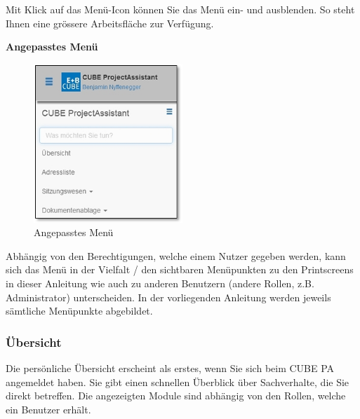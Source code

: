 \vspace{\baselineskip}

Mit Klick auf das Menü-Icon  können Sie das Menü ein- und ausblenden. So steht Ihnen eine grössere Arbeitsfläche zur Verfügung.

\vspace{6.5cm}  

\textbf{Angepasstes Menü}

\begin{figure}
\vspace{-50pt}
\includegraphics[height=60mm]{../chapters/01_Einfuehrung/pictures/1-3-1_MenuAngepasst.jpg}
\caption{Angepasstes Menü}
\end{figure}

Abhängig von den Berechtigungen, welche einem Nutzer gegeben werden, kann sich das Menü in der Vielfalt / den sichtbaren Menüpunkten zu den Printscreens in dieser Anleitung wie auch zu anderen Benutzern (andere Rollen, z.B. Administrator) unterscheiden. In der vorliegenden Anleitung werden jeweils sämtliche Menüpunkte abgebildet.

\subsubsection{Übersicht}
\label{bkm:Ref132000001}
Die persönliche Übersicht erscheint als erstes, wenn Sie sich beim CUBE PA angemeldet haben. Sie gibt einen schnellen Überblick über Sachverhalte, die Sie direkt betreffen. Die angezeigten Module sind abhängig von den Rollen, welche ein Benutzer erhält.


